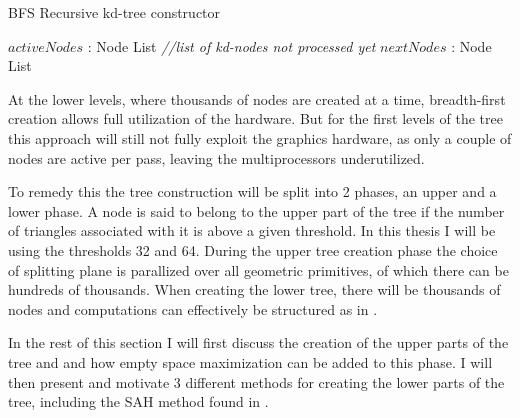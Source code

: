 \begin{algorithm}
  \caption{BFS Recursive kd-tree constructor}
  \label{alg:bfsKDTreeCreator}
  \begin{algorithmic}
              {$activeNodes$ : Node List  \textit{\color{gray}//list of kd-nodes not processed yet}}
              {$nextNodes$ : Node List}
              {
                 \ELSE
                 \ENDIF
               \ENDFOR}
  \end{algorithmic}
\end{algorithm}


At the lower levels, where thousands of nodes are created at a time,
breadth-first creation allows full utilization of the hardware. But
for the first levels of the tree this approach will still not fully
exploit the graphics hardware, as only a couple of nodes are active
per pass, leaving the multiprocessors underutilized.

To remedy this the tree construction will be split into 2 phases, an
upper and a lower phase. A node is said to belong to the upper part of
the tree if the number of triangles associated with it is above a
given threshold. In this thesis I will be using the thresholds 32 and
64. During the upper tree creation phase the choice of splitting plane
is parallized over all geometric primitives, of which there can be
hundreds of thousands. When creating the lower tree, there will be
thousands of nodes and computations can effectively be structured as
in .


In the rest of this section I will first discuss the creation of the
upper parts of the tree and and how empty space maximization can be
added to this phase. I will then present and motivate 3 different
methods for creating the lower parts of the tree, including the SAH
method found in \zhou{}.


